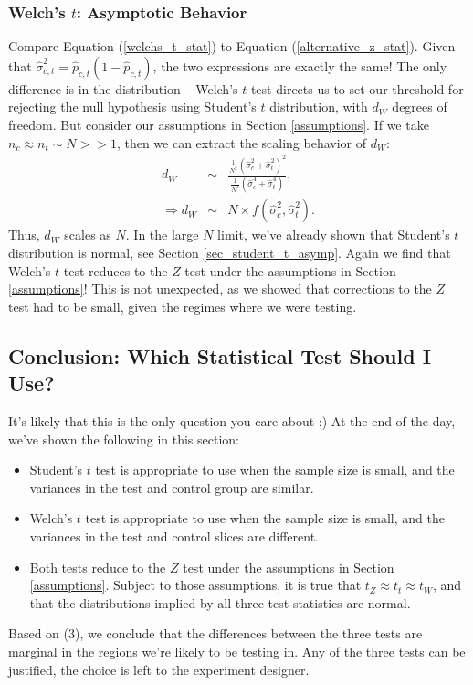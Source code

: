 \documentclass{article}
\numberwithin{equation}{section}
\begin{document}
\subsubsection{Welch's $t$: Asymptotic Behavior}
Compare Equation (\ref{welchs_t_stat}) to Equation (\ref{alternative_z_stat}). Given that $\hat{\sigma}_{c, t}^2 = \hat{p}_{c, t}(1-\hat{p}_{c, t})$, the two expressions are exactly the same! The only difference is in the distribution -- Welch's $t$ test directs us to set our threshold for rejecting the null hypothesis using Student's $t$ distribution, with $d_W$ degrees of freedom. But consider our assumptions in Section \ref{assumptions}. If we take $n_c \approx n_t \sim N >> 1$, then we can extract the scaling behavior of $d_W$:
\begin{eqnarray} \nonumber \label{nu_w_large_n}
	d_W &\sim& \frac{\frac{1}{N^2} \left(\hat{\sigma}_c^2 + \hat{\sigma}_t^2\right)^2}{\frac{1}{N^3}\left(\hat{\sigma}_c^4 + \hat{\sigma}_t^4\right)}, \\
	\Rightarrow d_W &\sim& N \times f\left(\hat{\sigma}^2_c, \hat{\sigma}^2_t\right).
\end{eqnarray}
Thus, $d_W$ scales as $N$. In the large $N$ limit, we've already shown that Student's $t$ distribution is normal, see Section \ref{sec_student_t_asymp}. Again we find that Welch's $t$ test reduces to the $Z$ test under the assumptions in Section \ref{assumptions}! This is not unexpected, as we showed that corrections to the $Z$ test had to be small, given the regimes where we were testing.

\subsection{Conclusion: Which Statistical Test Should I Use?}

It's likely that this is the only question you care about :) At the end of the day, we've shown the following in this section:
\begin{itemize}
	\item Student's $t$ test is appropriate to use when the sample size is small, and the variances in the test and control group are similar.
	\item Welch's $t$ test is appropriate to use when the sample size is small, and the variances in the test and control slices are different.
	\item Both tests reduce to the $Z$ test under the assumptions in Section \ref{assumptions}. Subject to those assumptions, it is true that $t_Z \approx t_t \approx t_W$, and that the distributions implied by all three test statistics are normal.
\end{itemize}
Based on (3), we conclude that the differences between the three tests are marginal in the regions we're likely to be testing in. Any of the three tests can be justified, the choice is left to the experiment designer.
\end{document}
